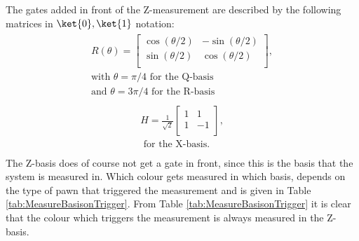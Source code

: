 \documentclass[final,5p,times,twocolumn,authoryear]{elsarticle}
\begin{document}
The gates added in front of the Z-measurement are described by the following matrices in $\ket{0},\ket{1}$ notation:
\begin{align}
\begin{split}
    R(\theta)=\left[\begin{matrix} \cos(\theta/2) & -\sin(\theta/2) \\ \sin(\theta/2) & \cos(\theta/2) \\ \end{matrix}\right], \\
    \text{with } \theta=\pi/4 \text{ for the Q-basis} \\
    \text{and } \theta = 3\pi/4 \text{ for the R-basis}
\end{split}
\label{eq:Rtheta}
\end{align}
\begin{align}
\begin{split}
    H=\frac{1}{\sqrt{2}}\left[\begin{matrix}1 & 1 \\ 1 & -1 \\ \end{matrix}\right], \\
    \text{ for the X-basis.} \\
\end{split}
\label{eq:Heq}
\end{align}
The Z-basis does of course not get a gate in front, since this is the basis that the system is measured in. Which colour gets measured in which basis, depends on the type of pawn that triggered the measurement and is given in Table \ref{tab:MeasureBasisonTrigger}. From Table \ref{tab:MeasureBasisonTrigger} it is clear that the colour which triggers the measurement is always measured in the Z-basis.
\end{document}
